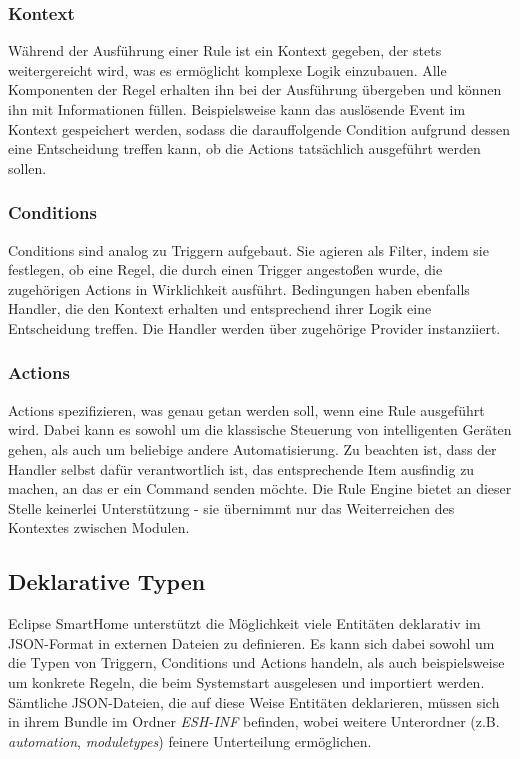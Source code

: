 \subsubsection{Kontext}
Während der Ausführung einer Rule ist ein Kontext gegeben, der stets weitergereicht wird, was es ermöglicht komplexe Logik einzubauen. Alle Komponenten der Regel erhalten ihn bei der Ausführung übergeben und können ihn mit Informationen füllen. Beispielsweise kann das auslösende Event im Kontext gespeichert werden, sodass die darauffolgende Condition aufgrund dessen eine Entscheidung treffen kann, ob die Actions tatsächlich ausgeführt werden sollen.

\subsubsection{Conditions}
Conditions sind analog zu Triggern aufgebaut. Sie agieren als Filter, indem sie festlegen, ob eine Regel, die durch einen Trigger angestoßen wurde, die zugehörigen Actions in Wirklichkeit ausführt. Bedingungen haben ebenfalls Handler, die den Kontext erhalten und entsprechend ihrer Logik eine Entscheidung treffen. Die Handler werden über zugehörige Provider instanziiert.

\subsubsection{Actions}
Actions spezifizieren, was genau getan werden soll, wenn eine Rule ausgeführt wird. Dabei kann es sowohl um die klassische Steuerung von intelligenten Geräten gehen, als auch um beliebige andere Automatisierung. Zu beachten ist, dass der Handler selbst dafür verantwortlich ist, das entsprechende Item ausfindig zu machen, an das er ein Command senden möchte. Die Rule Engine bietet an dieser Stelle keinerlei Unterstützung - sie übernimmt nur das Weiterreichen des Kontextes zwischen Modulen.


\subsection{Deklarative Typen}
Eclipse SmartHome unterstützt die Möglichkeit viele Entitäten deklarativ im JSON-Format in externen Dateien zu definieren. Es kann sich dabei sowohl um die Typen von Triggern, Conditions und Actions handeln, als auch beispielsweise um konkrete Regeln, die beim Systemstart ausgelesen und importiert werden. Sämtliche JSON-Dateien, die auf diese Weise Entitäten deklarieren, müssen sich in ihrem Bundle im Ordner \textit{ESH-INF} befinden, wobei weitere Unterordner (z.B. \textit{automation}, \textit{moduletypes}) feinere Unterteilung ermöglichen. \\

